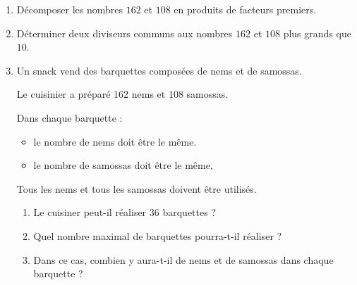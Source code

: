 
\medskip

\begin{enumerate}
\item Décomposer les nombres $162$ et $108$ en produits de facteurs premiers.
\item Déterminer deux diviseurs communs aux nombres $162$ et $108$ plus grands que $10$.
\item Un snack vend des barquettes composées de nems et de samossas.

Le cuisinier a préparé $162$ nems et $108$ samossas.

Dans chaque barquette :

\setlength\parindent{9mm}
\begin{itemize}
\item le nombre de nems doit être le même.
\item le nombre de samossas doit être le même,
\end{itemize}
\setlength\parindent{0mm}

Tous les nems et tous les samossas doivent être utilisés.
	\begin{enumerate}
		\item Le cuisiner peut-il réaliser $36$ barquettes ?
		\item Quel nombre maximal de barquettes pourra-t-il réaliser ?
		\item Dans ce cas, combien y aura-t-il de nems et de samossas dans chaque barquette ?
	\end{enumerate}
\end{enumerate}

\vspace{0,5cm}

